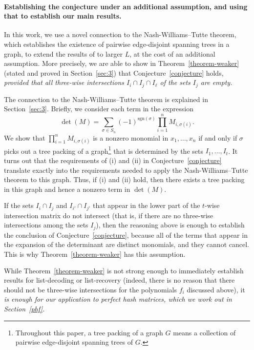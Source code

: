 \documentclass[11pt]{article}
\begin{document}
\paragraph{Establishing the conjecture under an additional assumption, and using that to establish our main results.}
In this work, we use a novel connection to the Nash-Williams--Tutte theorem, which establishes the existence of pairwise edge-disjoint spanning trees in a graph, to extend the results of \cite{shangguan2019combinatorial0} to larger $L$, at the cost of an additional assumption. More precisely, we are able to show in Theorem~\ref{theorem-weaker} (stated and proved in Section~\ref{sec:3}) that Conjecture~\ref{conjecture} holds, \em provided \em that all three-wise intersections $I_i\cap I_j\cap I_\ell$ of the sets $I_j$ are empty.

The connection to the Nash-Williams--Tutte theorem is explained in Section~\ref{sec:3}.  Briefly, we consider each term in the expression
\[ \det(M) = \sum_{\sigma \in S_n} (-1)^{\mathrm{sgn}(\sigma)} \prod_{i=1}^n M_{i,\sigma(i)}.\]
We show that $\prod_{i=1}^n M_{i, \sigma(i)}$ is a nonzero monomial in $x_1, \ldots, x_n$ if and only if $\sigma$ picks out a tree packing of a graph\footnote{Throughout this paper, a tree packing of a graph $G$ means a collection of pairwise edge-disjoint spanning trees of $G$.}  that is determined by the sets $I_1, \ldots, I_t$.  It turns out that the requirements of (i) and (ii) in Conjecture~\ref{conjecture} translate exactly into the requirements needed to apply the Nash-Williams--Tutte theorem to this graph.  Thus, if (i) and (ii) hold, then there exists a tree packing in this graph and hence a nonzero term in $\det(M)$.


If the sets $I_i \cap I_j$ and $I_{i'} \cap I_{j'}$ that appear in the lower part of the $t$-wise intersection matrix do not intersect (that is, if there are no three-wise intersections among the sets $I_j$), then the reasoning above is enough to establish the conclusion of Conjecture~\ref{conjecture}, because all of the terms that appear in the expansion of the determinant are distinct monomials, and they cannot cancel.  This is why Theorem~\ref{theorem-weaker} has this assumption.

While Theorem~\ref{theorem-weaker} is not strong enough to immediately establish results for list-decoding or list-recovery (indeed, there is no reason that there should not be three-wise intersections for the polynomials $f_i$ discussed above), it \em is \em enough for our application to perfect hash matrices, which we work out in Section~\ref{phf}.
\end{document}
